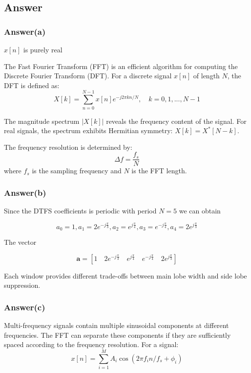 \documentclass[12pt,a4paper,UTF8]{article}
\begin{document}
\subsection{Answer}
\subsubsection{Answer(a)}
$x[n]$  is purely real

The Fast Fourier Transform (FFT) is an efficient algorithm for computing the Discrete Fourier Transform (DFT). For a discrete signal $x[n]$ of length $N$, the DFT is defined as:
\begin{equation}
X[k] = \sum_{n=0}^{N-1} x[n] e^{-j2\pi kn/N}, \quad k = 0, 1, ..., N-1
\end{equation}

The magnitude spectrum $|X[k]|$ reveals the frequency content of the signal. For real signals, the spectrum exhibits Hermitian symmetry: $X[k] = X^*[N-k]$.

The frequency resolution is determined by:
\begin{equation}
\Delta f = \frac{f_s}{N}
\end{equation}
where $f_s$ is the sampling frequency and $N$ is the FFT length.

\subsubsection{Answer(b)}
Since the DTFS coefficients is periodic with period $N = 5$ we can obtain

$$
a_0 = 1, a_1 = 2e^{-j\frac{\pi}{3}}, a_2 = e^{j\frac{\pi}{4}}, a_3 = e^{-j\frac{\pi}{4}}, a_4 = 2e^{j\frac{\pi}{3}}
$$

The vector

$$
\mathbf{a} = \left[ 1 \quad 2e^{-j\frac{\pi}{3}} \quad e^{j\frac{\pi}{4}} \quad e^{-j\frac{\pi}{4}} \quad 2e^{j\frac{\pi}{3}} \right]
$$

Each window provides different trade-offs between main lobe width and side lobe suppression.

\subsubsection{Answer(c)}
Multi-frequency signals contain multiple sinusoidal components at different frequencies. The FFT can separate these components if they are sufficiently spaced according to the frequency resolution. For a signal:
\begin{equation}
x[n] = \sum_{i=1}^{M} A_i \cos(2\pi f_i n / f_s + \phi_i)
\end{equation}
\end{document}
